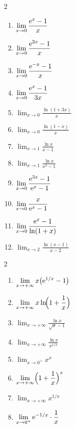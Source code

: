 \begin{multicols}{2}
\begin{enumerate}
	\item $\displaystyle\lim_{x\to 0}\frac{\mathrm{e}^x-1}{x}$
	\item $\displaystyle\lim_{x\to 0}\frac{\mathrm{e}^{2x}-1}{x}$
	\item $\displaystyle\lim_{x\to 0}\frac{\mathrm{e}^{-x}-1}{x}$
	\item $\displaystyle\lim_{x\to 0}\frac{\mathrm{e}^{x}-1}{3x}$
	\item $\displaystyle\lim_{x\to 0}\frac{\ln(1+3x)}{x}$
	\item $\displaystyle\lim_{x\to 0}\frac{\ln(1-x)}{x}$
	\item $\displaystyle\lim_{x\to 1}\frac{\ln x}{x-1}$
	\item $\displaystyle\lim_{x\to 1}\frac{\ln x}{x^2-1}$
	\item $\displaystyle\lim_{x\to 0}\frac{\mathrm{e}^{3x}-1}{\mathrm{e}^{x}-1}$
	\item $\displaystyle\lim_{x\to 0}\frac{x}{\mathrm{e}^x-1}$
	\item $\displaystyle\lim_{x\to 0}\frac{\mathrm{e}^x-1}{\ln(1+x)}$
	\item $\displaystyle\lim_{x\to 2}\frac{\ln(x-1)}{x-2}$
\end{enumerate}
\end{multicols}

\begin{multicols}{2}
\begin{enumerate}
	\item $\displaystyle\lim_{x\to+\infty}x\bigl(\mathrm{e}^{1/x}-1\bigr)$
	\item $\displaystyle\lim_{x\to+\infty}x\ln\!\Bigl(1+\frac{1}{x}\Bigr)$
	\item $\displaystyle\lim_{x\to+\infty}\frac{\ln x}{\sqrt{x}-1}$
	\item $\displaystyle\lim_{x\to+\infty}\frac{\ln x}{x^{1/3}}$
	\item $\displaystyle\lim_{x\to 0^+}x^{x}$
	\item $\displaystyle\lim_{x\to+\infty}\Bigl(1+\frac{1}{x}\Bigr)^{x}$
	\item $\displaystyle\lim_{x\to+\infty}x^{1/x}$
	\item $\displaystyle\lim_{x\to 0^+}\mathrm{e}^{-1/x}\cdot\frac{1}{x}$
\end{enumerate}
\end{multicols}


